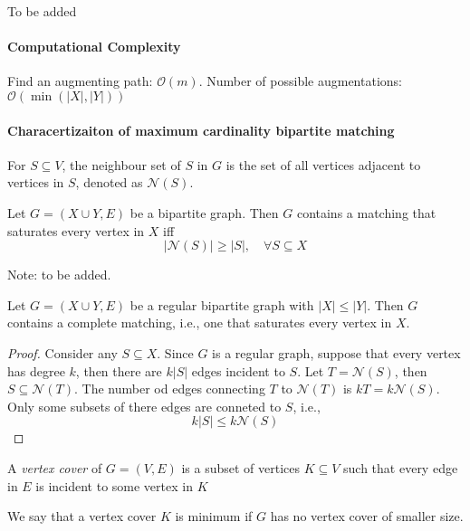 \begin{example}
To be added
\end{example}

\paragraph{Computational Complexity}
Find an augmenting path: $\mathcal{O}(m)$.
Number of possible augmentations: $\mathcal{O}(\min(|X|,|Y|))$

\paragraph{Characertizaiton of maximum cardinality bipartite matching}
\begin{definition}
For $S\subseteq V$, the neighbour set of $S$ in $G$ is the set of all vertices adjacent to vertices in $S$, denoted as $\mathcal{N}(S)$.
\end{definition}

\begin{theorem}
Let $G=(X\cup Y,E)$ be a bipartite graph.
Then $G$ contains a matching that saturates every vertex in $X$ iff
\[
|\mathcal{N}(S)|\ge|S|,\quad
\forall S\subseteq X
\]
\end{theorem}
Note: to be added.

\begin{corollary}
Let $G=(X\cup Y,E)$ be a regular bipartite graph with $|X|\le |Y|$.
Then $G$ contains a complete matching, i.e., one that saturates every vertex in $X$. 
\end{corollary}
\begin{proof}
Consider any $S\subseteq X$. Since $G$ is a regular graph, suppose that every vertex has degree $k$, then there are $k|S|$ edges incident to $S$.
Let $T=\mathcal{N}(S)$, then $S\subseteq\mathcal{N}(T)$.
The number od edges connecting $T$ to $\mathcal{N}(T)$ is $kT=k\mathcal{N}(S)$.
Only some subsets of there edges are conneted to $S$, i.e., 
\[
k|S|\le k\mathcal{N}(S)
\]
\end{proof}

\begin{definition}
A \emph{vertex cover} of $G=(V,E)$ is a subset of vertices $K\subseteq V$ such that 
every edge in $E$ is incident to some vertex in $K$
\end{definition}
We say that a vertex cover $K$ is minimum if $G$ has no vertex cover of smaller size.

